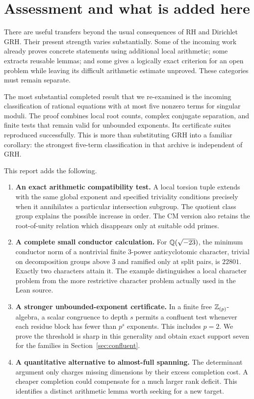 \section{Assessment and what is added here}

There are useful transfers beyond the usual consequences of RH and Dirichlet GRH. Their present strength varies substantially. Some of the incoming work already proves concrete statements using additional local arithmetic; some extracts reusable lemmas; and some gives a logically exact criterion for an open problem while leaving its difficult arithmetic estimate unproved. These categories must remain separate.

The most substantial completed result that we re-examined is the incoming classification of rational equations with at most five nonzero terms for singular moduli. The proof combines local root counts, complex conjugate separation, and finite tests that remain valid for unbounded exponents. Its certificate suites reproduced successfully. This is more than substituting GRH into a familiar corollary: the strongest five-term classification in that archive is independent of GRH.\cite{prior_sparse}

This report adds the following.

\begin{enumerate}
\item \textbf{An exact arithmetic compatibility test.} A local torsion tuple extends with the same global exponent and specified triviality conditions precisely when it annihilates a particular intersection subgroup. The quotient class group explains the possible increase in order. The CM version also retains the root-of-unity relation which disappears only at suitable odd primes.
\item \textbf{A complete small conductor calculation.} For $\mathbb Q(\sqrt{-23})$, the minimum conductor norm of a nontrivial finite $3$-power anticyclotomic character, trivial on decomposition groups above $3$ and ramified only at split pairs, is $22801$. Exactly two characters attain it. The example distinguishes a local character problem from the more restrictive character problem actually used in the Lean source.
\item \textbf{A stronger unbounded-exponent certificate.} In a finite free $\mathbb Z_{(p)}$-algebra, a scalar congruence to depth $s$ permits a confluent test whenever each residue block has fewer than $p^s$ exponents. This includes $p=2$. We prove the threshold is sharp in this generality and obtain exact support seven for the families in Section~\ref{sec:confluent}.
\item \textbf{A quantitative alternative to almost-full spanning.} The determinant argument only charges missing dimensions by their excess completion cost. A cheaper completion could compensate for a much larger rank deficit. This identifies a distinct arithmetic lemma worth seeking for a new target.
\end{enumerate}

